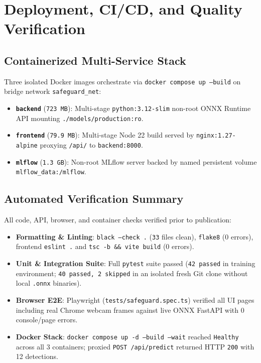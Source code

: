 \documentclass[11pt,a4paper]{article}
\begin{document}
\section{Deployment, CI/CD, and Quality Verification}

\subsection{Containerized Multi-Service Stack}
Three isolated Docker images orchestrate via \texttt{docker compose up --build} on bridge network \texttt{safeguard\_net}:
\begin{itemize}
  \item \textbf{\texttt{backend}} (\texttt{723 MB}): Multi-stage \texttt{python:3.12-slim} non-root ONNX Runtime API mounting \texttt{./models/production:ro}.
  \item \textbf{\texttt{frontend}} (\texttt{79.9 MB}): Multi-stage Node 22 build served by \texttt{nginx:1.27-alpine} proxying \texttt{/api/} to \texttt{backend:8000}.
  \item \textbf{\texttt{mlflow}} (\texttt{1.3 GB}): Non-root MLflow server backed by named persistent volume \texttt{mlflow\_data:/mlflow}.
\end{itemize}

\subsection{Automated Verification Summary}
All code, API, browser, and container checks verified prior to publication:
\begin{itemize}
  \item \textbf{Formatting \& Linting}: \texttt{black --check .} (\texttt{33} files clean), \texttt{flake8} (0 errors), frontend \texttt{eslint .} and \texttt{tsc -b \&\& vite build} (0 errors).
  \item \textbf{Unit \& Integration Suite}: Full \texttt{pytest} suite passed (\texttt{42 passed} in training environment; \texttt{40 passed, 2 skipped} in an isolated fresh Git clone without local \texttt{.onnx} binaries).
  \item \textbf{Browser E2E}: Playwright (\texttt{tests/safeguard.spec.ts}) verified all UI pages including real Chrome webcam frames against live ONNX FastAPI with 0 console/page errors.
  \item \textbf{Docker Stack}: \texttt{docker compose up -d --build --wait} reached \texttt{Healthy} across all 3 containers; proxied \texttt{POST /api/predict} returned HTTP \texttt{200} with 12 detections.
\end{itemize}
\end{document}
